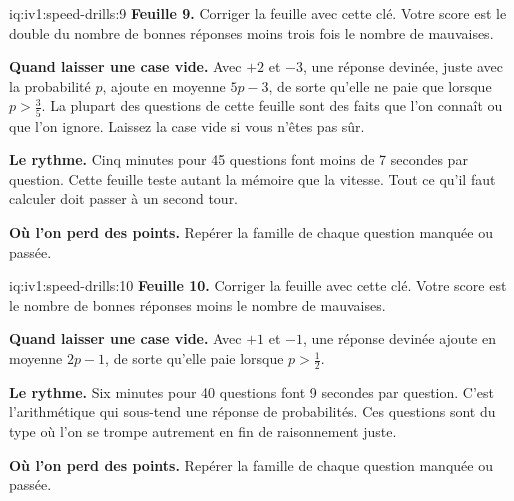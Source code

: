 \begin{solution}{iq:iv1:speed-drills:9}
\textbf{Feuille 9.} Corriger la feuille avec cette clé. Votre score est le double du nombre de bonnes réponses moins trois fois le nombre de mauvaises.
\par\nopagebreak


\textbf{Quand laisser une case vide.} Avec $+2$ et $-3$, une réponse devinée, juste avec la probabilité $p$, ajoute en moyenne $5p - 3$, de sorte qu'elle ne paie que lorsque $p > \tfrac35$. La plupart des questions de cette feuille sont des faits que l'on connaît ou que l'on ignore. Laissez la case vide si vous n'êtes pas sûr.

\textbf{Le rythme.} Cinq minutes pour 45 questions font moins de 7 secondes par question. Cette feuille teste autant la mémoire que la vitesse. Tout ce qu'il faut calculer doit passer à un second tour.

\textbf{Où l'on perd des points.} Repérer la famille de chaque question manquée ou passée.


\end{solution}

\begin{solution}{iq:iv1:speed-drills:10}
\textbf{Feuille 10.} Corriger la feuille avec cette clé. Votre score est le nombre de bonnes réponses moins le nombre de mauvaises.
\par\nopagebreak


\textbf{Quand laisser une case vide.} Avec $+1$ et $-1$, une réponse devinée ajoute en moyenne $2p - 1$, de sorte qu'elle paie lorsque $p > \tfrac12$.

\textbf{Le rythme.} Six minutes pour 40 questions font 9 secondes par question. C'est l'arithmétique qui sous-tend une réponse de probabilités. Ces questions sont du type où l'on se trompe autrement en fin de raisonnement juste.

\textbf{Où l'on perd des points.} Repérer la famille de chaque question manquée ou passée.


\end{solution}

